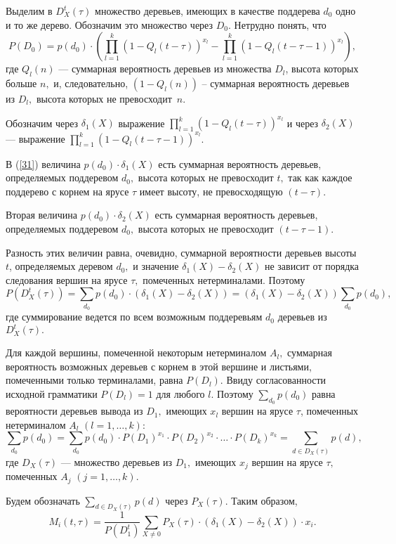 \documentclass[12pt,russian]{article}
\begin{document}
{Выделим в $D_X^t(\tau)$ множество деревьев, имеющих в качестве поддерева
$d_0$ одно и то же дерево. Обозначим это множество через $D_0.$
Нетрудно понять, что
\begin{equation}
P\left(D_0\right)=
p(d_0)\cdot
\left(\prod_{l=1}^k (1-Q_l(t-\tau))^{x_l} -
\prod_{l=1}^k (1-Q_l(t-\tau-1))^{x_l}\right),  
\label{31}
\end{equation}
где $Q_l(n)$ --- суммарная вероятность деревьев из множества $D_l$,
высота которых больше $n,$ и, следовательно,
$\left(1-Q_l(n)\right)$ -- суммарная вероятность деревьев из
$D_l,$ высота которых не превосходит~$n.$

Обозначим через $\delta_1(X)$ выражение
$\prod_{l=1}^k (1-Q_l(t-\tau))^{x_l} $
и через $\delta_2(X)$ --- выражение
$ \prod_{l=1}^k (1-Q_l(t-\tau-1))^{x_l}.$

В (\ref{31}) величина $p(d_0)\cdot\delta_1(X) $
есть суммарная вероятность деревьев, определяемых поддеревом $d_0,$
высота которых не превосходит $t,$ так как каждое поддерево с корнем
на ярусе $\tau$ имеет высоту, не превосходящую $(t-\tau).$

Вторая величина $p(d_0)\cdot\delta_2(X) $
есть суммарная вероятность деревьев, определяемых поддеревом $d_0,$
высота которых не превосходит $(t-\tau-1).$

Разность этих величин равна, очевидно, суммарной вероятности
деревьев высоты $t$, определяемых деревом $d_0,$ и значение
$\delta_1(X)-\delta_2(X)$ не зависит от порядка следования
вершин на ярусе $\tau,$ помеченных нетерминалами. Поэтому
$$
P(D_X^t(\tau))=\sum_{d_0} p(d_0)\cdot \left(\delta_1(X)-\delta_2(X)\right) =
\left(\delta_1(X)-\delta_2(X)\right)\sum_{d_0}p(d_0),
$$
где суммирование ведется по всем возможным поддеревьям $d_0$
деревьев из $D_X^t(\tau).$

Для каждой вершины, помеченной некоторым нетерминалом $A_l,$
суммарная вероятность возможных деревьев с корнем в этой вершине
и листьями, помеченными только терминалами, равна $P(D_l).$
Ввиду согласованности исходной грамматики $P(D_l)=1$ для любого $l$.
Поэтому $\sum_{d_0}p(d_0)$ равна вероятности деревьев вывода из $D_1,$ имеющих $x_l$ вершин на ярусе
$\tau$, помеченных нетерминалом $A_l$ $(l=1,\ldots,k):$
$$
\sum_{d_0}p(d_0)=
\sum_{d_0}p(d_0) \cdot P(D_1)^{x_1} \cdot P(D_2)^{x_2}\cdot \ldots
\cdot P(D_k)^{x_k}=
\sum_{d \in D_X(\tau)}p(d),
$$
где $D_X(\tau)$ --- множество деревьев из $D_1,$ имеющих $x_j$ вершин на ярусе
$\tau,$ помеченных $A_j \,\, (j=1,\ldots,k).$

Будем обозначать $\sum_{d \in D_X(\tau)}p(d)$ через $P_X(\tau).$ 
Таким образом,
$$
M_i(t,\tau)=\frac{1}{P(D^t_1)} \sum_{X \ne 0} P_X(\tau)\cdot
\left(\delta_1(X)-\delta_2(X)\right)\cdot x_{i}.
$$

}
\end{document}
